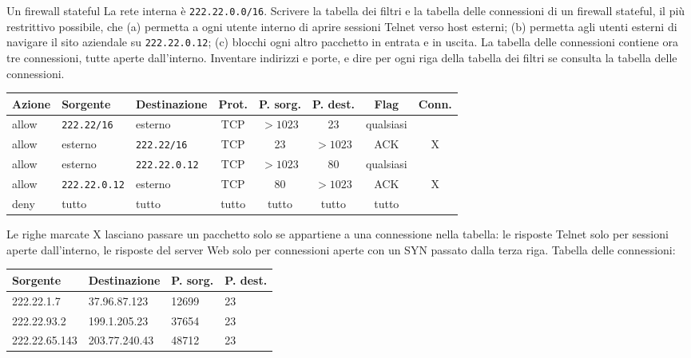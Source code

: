 \begin{esercizio}{Un firewall stateful}
La rete interna è \texttt{222.22.0.0/16}. Scrivere la tabella dei filtri e la tabella delle connessioni di un firewall stateful, il più
restrittivo possibile, che (a) permetta a ogni utente interno di aprire sessioni Telnet verso host esterni; (b) permetta agli utenti esterni
di navigare il sito aziendale su \texttt{222.22.0.12}; (c) blocchi ogni altro pacchetto in entrata e in uscita. La tabella delle connessioni
contiene ora tre connessioni, tutte aperte dall'interno. Inventare indirizzi e porte, e dire per ogni riga della tabella dei filtri se
consulta la tabella delle connessioni.

\svolgimento
\begin{center}
\small
\begin{tabular}{lllcccc c}
\toprule
\textbf{Azione} & \textbf{Sorgente} & \textbf{Destinazione} & \textbf{Prot.} & \textbf{P. sorg.} & \textbf{P. dest.} & \textbf{Flag} &
\textbf{Conn.} \\
\midrule
allow & \texttt{222.22/16} & esterno & TCP & $>1023$ & 23 & qualsiasi & \\
allow & esterno & \texttt{222.22/16} & TCP & 23 & $>1023$ & ACK & X \\
allow & esterno & \texttt{222.22.0.12} & TCP & $>1023$ & 80 & qualsiasi & \\
allow & \texttt{222.22.0.12} & esterno & TCP & 80 & $>1023$ & ACK & X \\
deny & tutto & tutto & tutto & tutto & tutto & tutto & \\
\bottomrule
\end{tabular}
\end{center}
Le righe marcate X lasciano passare un pacchetto solo se appartiene a una connessione nella tabella: le risposte Telnet solo per sessioni
aperte dall'interno, le risposte del server Web solo per connessioni aperte con un SYN passato dalla terza riga. Tabella delle connessioni:
\begin{center}
\small\ttfamily
\begin{tabular}{llll}
\toprule
\textrm{\textbf{Sorgente}} & \textrm{\textbf{Destinazione}} & \textrm{\textbf{P. sorg.}} & \textrm{\textbf{P. dest.}} \\
\midrule
222.22.1.7 & 37.96.87.123 & 12699 & 23 \\
222.22.93.2 & 199.1.205.23 & 37654 & 23 \\
222.22.65.143 & 203.77.240.43 & 48712 & 23 \\
\bottomrule
\end{tabular}
\end{center}
\end{esercizio}

